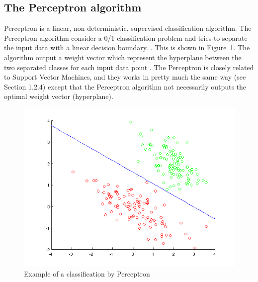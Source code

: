 \subsection{The Perceptron algorithm}
Perceptron is a linear, non deterministic, supervised classification algorithm. The Perceptron algorithm consider a 0/1 classification problem
and tries to separate the input data with a linear decision boundary. \citep{perceptron_ai, perceptron_url}. This is shown in Figure~\ref{fig:perceptron}. The algorithm output a weight vector which represent the hyperplane between the two separated classes for each input data point \citep{perceptron_url}. The Perceptron is closely related to Support Vector Machines, and they works in pretty much the same way (see Section 1.2.4) except that the Perceptron algorithm not necessarily outputs the optimal weight vector (hyperplane).
\begin{figure}[h!]
\centering
\includegraphics[scale = 0.4]{../Plottar/perceptron_example.png}
\caption{Example of a classification by Perceptron}
\label{fig:perceptron}
\end{figure}\\
